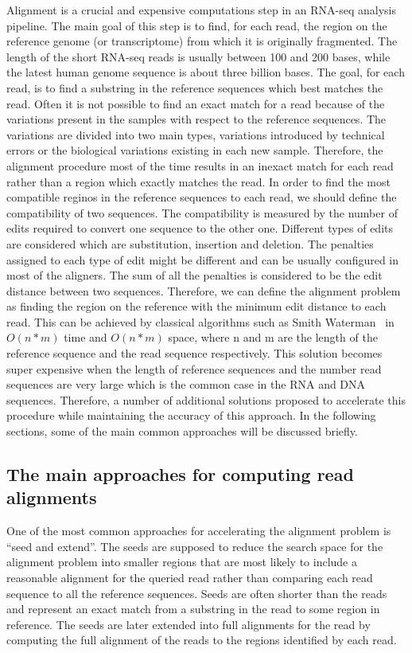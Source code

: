 Alignment is a crucial and expensive computations step in an RNA-seq analysis 
pipeline. The main goal of this step is to find, for each read, the region on 
the reference genome (or transcriptome) from which it is originally fragmented. 
The length of the short RNA-seq reads is usually between 100 and 200 bases, 
while the latest human genome sequence is about three billion bases. The goal, 
for each read, is  to find a substring in the reference sequences which best 
matches the read. Often it is not possible to find an exact match for a read 
because of the variations present in the samples with respect to the reference 
sequences. The variations are divided into two main types, variations introduced 
by technical errors or the biological variations existing in each new sample. 
Therefore, the alignment procedure most of the time results in an inexact 
match for each read rather than a region which exactly matches the read. 
In order to find the most compatible reginos in the reference sequences to 
each read, we should define the compatibility of two sequences. The compatibility 
is measured by the number of edits required to convert one sequence to the 
other one. Different types of edits are considered which are substitution, 
insertion and deletion. The penalties assigned to each type of edit might be 
different and can be usually configured in most of the aligners. The sum of 
all the penalties is considered to be the edit distance between two sequences.
Therefore, we can define the alignment problem as finding the region on the 
reference with the minimum edit distance to each read. This can be achieved 
by classical algorithms such as Smith Waterman~\citep{smith1981identification} 
in $O(n*m)$ time and $O(n*m)$ space, where n and m are the length of the 
reference sequence and the read sequence respectively. This solution becomes 
super expensive when the length of reference sequences and the number read 
sequences are very large which is the common case in the RNA and DNA sequences. 
Therefore, a number of additional solutions proposed to accelerate this procedure 
while maintaining the accuracy of this approach. In the following sections, 
some of the main common approaches will be discussed briefly.

\subsection{The main approaches for computing read alignments}
One of the most common approaches for accelerating the alignment problem is 
“seed and extend”. The seeds are supposed to reduce the search space for the 
alignment problem into smaller regions that are most likely to include a 
reasonable alignment for the queried read rather than comparing each read 
sequence to all the reference sequences. Seeds are often shorter than the 
reads and represent an exact match from a substring in the read to some 
region in reference. The seeds are later extended into full alignments for 
the read by computing the full alignment of the reads to the regions 
identified by each read.

